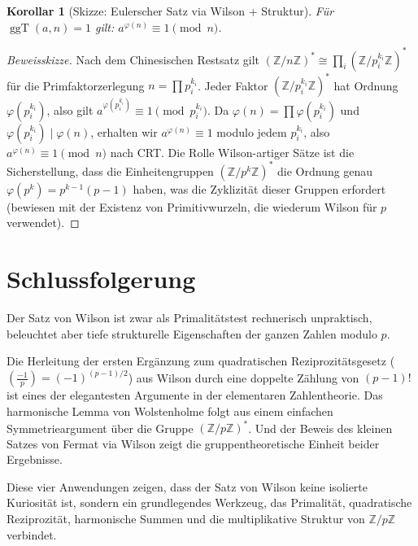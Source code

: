 \documentclass[12pt,a4paper]{amsart}
\newtheorem{korollar}[theorem]{Korollar}
\theoremstyle{definition}
\newcommand{\Z}{\mathbb{Z}}
\DeclareMathOperator{\ggT}{ggT}
\newcommand{\leg}[2]{\left(\frac{#1}{#2}\right)}
\begin{document}
\begin{korollar}[Skizze: Eulerscher Satz via Wilson + Struktur]\label{kor:euler}
  Für $\ggT(a, n) = 1$ gilt: $a^{\varphi(n)} \equiv 1 \pmod{n}$.
\end{korollar}

\begin{proof}[Beweisskizze]
  Nach dem Chinesischen Restsatz gilt $(\Z/n\Z)^* \cong \prod_i (\Z/p_i^{k_i}\Z)^*$
  für die Primfaktorzerlegung $n = \prod p_i^{k_i}$.
  Jeder Faktor $(\Z/p_i^{k_i}\Z)^*$ hat Ordnung $\varphi(p_i^{k_i})$, also gilt
  $a^{\varphi(p_i^{k_i})} \equiv 1 \pmod{p_i^{k_i}}$.
  Da $\varphi(n) = \prod \varphi(p_i^{k_i})$ und $\varphi(p_i^{k_i}) \mid \varphi(n)$,
  erhalten wir $a^{\varphi(n)} \equiv 1$ modulo jedem $p_i^{k_i}$, also
  $a^{\varphi(n)} \equiv 1 \pmod{n}$ nach CRT.
  Die Rolle Wilson-artiger Sätze ist die Sicherstellung, dass die Einheitengruppen
  $(\Z/p^k\Z)^*$ die Ordnung genau $\varphi(p^k) = p^{k-1}(p-1)$ haben, was die
  Zyklizität dieser Gruppen erfordert (bewiesen mit der Existenz von Primitivwurzeln,
  die wiederum Wilson für $p$ verwendet).
\end{proof}

\section{Schlussfolgerung}

Der Satz von Wilson ist zwar als Primalitätstest rechnerisch unpraktisch,
beleuchtet aber tiefe strukturelle Eigenschaften der ganzen Zahlen modulo $p$.

Die Herleitung der ersten Ergänzung zum quadratischen Reziprozitätsgesetz
($\leg{-1}{p} = (-1)^{(p-1)/2}$) aus Wilson durch eine doppelte Zählung
von $(p-1)!$ ist eines der elegantesten Argumente in der elementaren
Zahlentheorie. Das harmonische Lemma von Wolstenholme folgt aus einem einfachen
Symmetrieargument über die Gruppe $(\Z/p\Z)^*$. Und der Beweis des kleinen
Satzes von Fermat via Wilson zeigt die gruppentheoretische Einheit beider
Ergebnisse.

Diese vier Anwendungen zeigen, dass der Satz von Wilson keine isolierte
Kuriosität ist, sondern ein grundlegendes Werkzeug, das Primalität,
quadratische Reziprozität, harmonische Summen und die multiplikative Struktur
von $\Z/p\Z$ verbindet.
\end{document}
